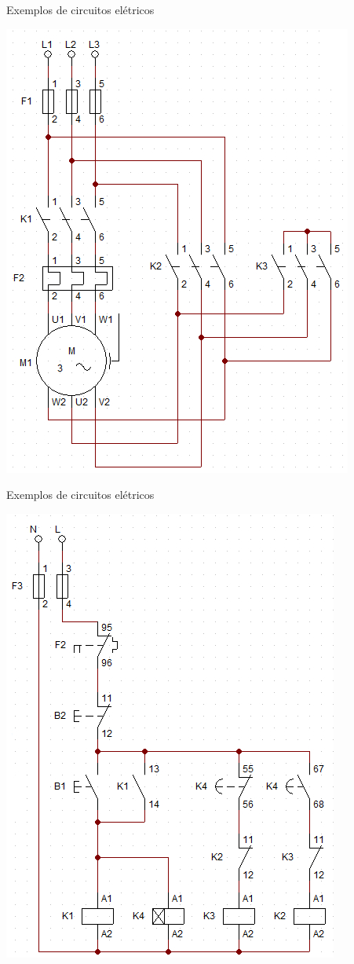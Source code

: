 \begin{frame}{Exemplos de circuitos elétricos}
\centerline{\includegraphics[height=0.9\textheight]{Figuras/Ch07/fig20.jpg}}
\end{frame}


\begin{frame}{Exemplos de circuitos elétricos}
\centerline{\includegraphics[height=0.9\textheight]{Figuras/Ch07/fig21.jpg}}
\end{frame}


